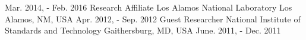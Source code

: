 \begin{cventries}
  {Mar. 2014, - Feb. 2016} %
  {
  }
  \cventry
  {Research Affiliate} %
  {Los Alamos National Laboratory} %
  {Los Alamos, NM, USA} %
  {Apr. 2012, - Sep. 2012} %
  {
  }
  \cventry
  {Guest Researcher} %
  {National Institute of Standards and Technology} %
  {Gaithersburg, MD, USA} %
  {June. 2011, - Dec. 2011} %
  {
  }



\end{cventries}
